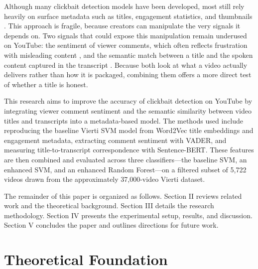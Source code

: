 \documentclass[conference]{IEEEtran}
\begin{document}
Although many clickbait detection models have been developed, most still rely heavily on surface metadata such as titles, engagement statistics, and thumbnails \cite{varshney2021, gothankar2022, rahman2023, bajaj2024}. This approach is fragile, because creators can manipulate the very signals it depends on. Two signals that could expose this manipulation remain underused on YouTube: the sentiment of viewer comments, which often reflects frustration with misleading content \cite{elyashar2022}, and the semantic match between a title and the spoken content captured in the transcript \cite{gothankar2022, ahmadi2023}. Because both look at what a video actually delivers rather than how it is packaged, combining them offers a more direct test of whether a title is honest.

This research aims to improve the accuracy of clickbait detection on YouTube by integrating viewer comment sentiment and the semantic similarity between video titles and transcripts into a metadata-based model. The methods used include reproducing the baseline Vierti SVM model \cite{vierti2019} from Word2Vec title embeddings and engagement metadata, extracting comment sentiment with VADER, and measuring title-to-transcript correspondence with Sentence-BERT. These features are then combined and evaluated across three classifiers---the baseline SVM, an enhanced SVM, and an enhanced Random Forest---on a filtered subset of 5,722 videos drawn from the approximately 37,000-video Vierti dataset.
 
The remainder of this paper is organized as follows. Section II reviews related work and the theoretical background. Section III details the research methodology. Section IV presents the experimental setup, results, and discussion. Section V concludes the paper and outlines directions for future work.


\section{Theoretical Foundation}
\end{document}
